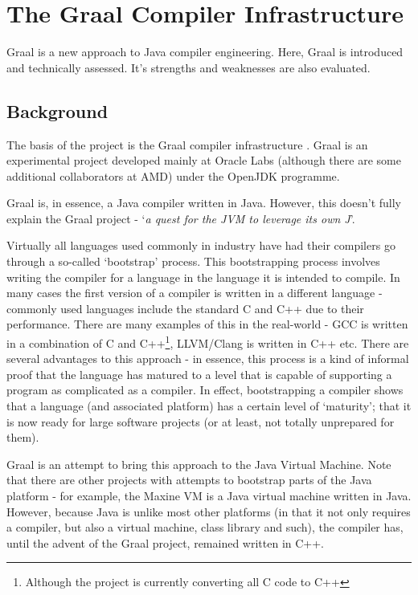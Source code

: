 \chapter{The Graal Compiler Infrastructure} \label{chp:graal}
Graal is a new approach to Java compiler engineering. Here, Graal is introduced and technically assessed. It's strengths and weaknesses are also evaluated.

\section{Background} \label{sec:graal/background}
The basis of the project is the Graal compiler infrastructure \citep{Graal}. Graal is an experimental project developed mainly at Oracle Labs (although there are some additional collaborators at AMD) under the OpenJDK programme.
	
Graal is, in essence, a Java compiler written in Java. However, this doesn't fully explain the Graal project  - `\textit{a quest for the JVM to leverage its own J}'.
	
Virtually all languages used commonly in industry have had their compilers go through a so-called `bootstrap' process. This bootstrapping process involves writing the compiler for a language in the language it is intended to compile. In many cases the first version of a compiler is written in a different language - commonly used languages include the standard C and C++ due to their performance. There are many examples of this in the real-world - GCC is written in a combination of C and C++\footnote{Although the project is currently converting all C code to C++}, LLVM/Clang is written in C++ etc. There are several advantages to this approach - in essence, this process is a kind of informal proof that the language has matured to a level that is capable of supporting a program as complicated as a compiler. In effect, bootstrapping a compiler shows that a language (and associated platform) has a certain level of `maturity'; that it is now ready for large software projects (or at least, not totally unprepared for them).

Graal is an attempt to bring this approach to the Java Virtual Machine. Note that there are other projects with attempts to bootstrap parts of the Java platform - for example, the Maxine VM is a Java virtual machine written in Java. However, because Java is unlike most other platforms (in that it not only requires a compiler, but also a virtual machine, class library and such), the compiler has, until the advent of the Graal project, remained written in C++.

